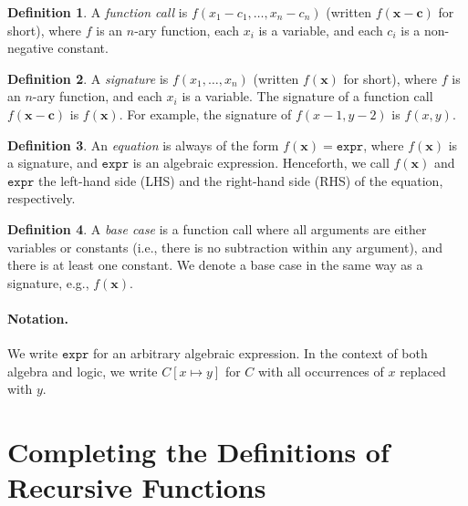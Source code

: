 \documentclass{article}
\theoremstyle{definition}
\newtheorem{definition}{Definition}
\newcommand{\expr}{\mathtt{expr}}
\begin{document}
\begin{definition}
  A \emph{function call} is $f(x_{1} - c_{1}, \dots, x_{n} - c_{n})$ (written
  $f(\mathbf{x} - \mathbf{c})$ for short), where $f$ is an $n$-ary function,
  each $x_{i}$ is a variable, and each $c_{i}$ is a non-negative constant.
\end{definition}

\begin{definition}
  A \emph{signature} is $f(x_{1}, \dots, x_{n})$ (written $f(\mathbf{x})$ for
  short), where $f$ is an $n$-ary function, and each $x_{i}$ is a variable. The
  signature of a function call $f(\mathbf{x} - \mathbf{c})$ is $f(\mathbf{x})$.
  For example, the signature of $f(x - 1, y - 2)$ is $f(x, y)$.
\end{definition}

\begin{definition}
  An \emph{equation} is always of the form $f(\mathbf{x}) = \expr{}$, where
  $f(\mathbf{x})$ is a signature, and $\expr{}$ is an algebraic expression.
  Henceforth, we call $f(\mathbf{x})$ and $\expr{}$ the left-hand side (LHS) and
  the right-hand side (RHS) of the equation, respectively.
\end{definition}


\begin{definition}
  A \emph{base case} is a function call where all arguments are either variables
  or constants (i.e., there is no subtraction within any argument), and there is
  at least one constant. We denote a base case in the same way as a signature,
  e.g., $f(\mathbf{x})$.
\end{definition}

\paragraph{Notation.}
We write $\expr{}$ for an arbitrary algebraic expression. In the context of both
algebra and logic, we write $C[x \mapsto y]$ for $C$ with all occurrences of $x$
replaced with $y$.

\section{Completing the Definitions of Recursive Functions}\label{sec:main}
\end{document}
